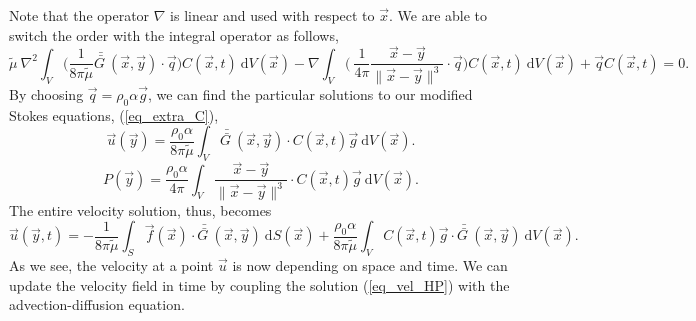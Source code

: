 Note that the operator $\nabla$ is linear and used with respect to $\vec{x}$. We are able to switch the order with the integral operator as follows,
\begin{equation}
	\tilde{\mu} \ \nabla^2 
	\int_{V}
	\biggl( \frac{1}{8\pi \tilde{\mu}}  \bar{\bar{G \ }}(\vec{x}, \vec{y})
	\cdot  \vec{q} \biggr)
	C(\vec{x}, t)
	\ \textrm{d}V(\vec{x})
	-
	\nabla 
	\int_{V}
	\biggl(\ \frac{1}{4\pi }  
	\frac{\vec{x} - \vec{y}}{\| \vec{x} - \vec{y}\|^3}
	\cdot  \vec{q} \biggr)
	C(\vec{x}, t)
	\ \textrm{d}V(\vec{x})
	+\vec{q} C(\vec{x}, t) = 0 .
\label{eq_single_stokes_sub3}
\end{equation}
By choosing $\vec{q} = \rho_0 \alpha \vec{g}$, we can find the particular solutions to our modified Stokes equations, (\ref{eq_extra_C}),
\begin{equation}
	\vec{u} (\vec{y}) =
	 \frac{\rho_0 \alpha }{8\pi \tilde{\mu}}
	\int_{V}  \bar{\bar{G \ }}(\vec{x}, \vec{y})
	\cdot  C(\vec{x}, t) \vec{g} 
	\ \textrm{d}V(\vec{x}).
\label{eq_fund_soln_unit}
\end{equation}
\begin{equation}
	P(\vec{y}) = 
	\frac{\rho_0 \alpha }{4\pi }  
	\int_{V}
	\frac{\vec{x} - \vec{y}}{\| \vec{x} - \vec{y}\|^3}
	\cdot 
	C(\vec{x}, t) \vec{g} 
	\ \textrm{d}V(\vec{x}).
\label{eq_fund_soln_p}
\end{equation}
The entire velocity solution, thus, becomes
\begin{equation}
	 \vec{u} \left(\vec{y}, t \right) =
	 - \frac{1}{8 \pi \tilde{\mu}} \int_{S}  
		 \vec{f}(\vec{x}) 
		 \cdot \bar{\bar{G \ }} (\vec{x},\vec{y}) 
		 \ \textrm{d}S(\vec{x})
	+ \frac{ \rho_0 \alpha  }{8\pi \tilde{\mu}} \int_V  C \left(\vec{x},  t \right) \vec{g} \cdot 
	\bar{\bar{G \ }}(\vec{x}, \vec{y} ) 
	\ \text{d}V(\vec{x}).
\label{eq_vel_HP}
\end{equation}
As we see, the velocity at a point $\vec{u}$ is now depending on space and time. We can update the velocity field in time by coupling the solution (\ref{eq_vel_HP}) with the advection-diffusion equation. 
